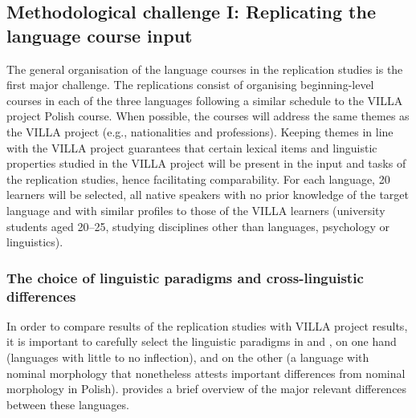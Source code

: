 \documentclass[output=paper,colorlinks,citecolor=brown,modfonts,nonflat]{../langscibook}
\begin{document}
\subsection{Methodological challenge I: Replicating the language course input}\label{sec:watorek:4.1}

The general organisation of the language courses in the replication studies is the first major challenge. The replications consist of organising beginning-level courses in each of the three languages following a similar schedule to the VILLA project Polish course. When possible, the courses will address the same themes as the VILLA project (e.g., nationalities and professions). Keeping themes in line with the VILLA project guarantees that certain lexical items and linguistic properties studied in the VILLA project will be present in the input and tasks of the replication studies, hence facilitating comparability. For each language, 20 learners will be selected, all  native speakers with no prior knowledge of the target language and with similar profiles to those of the VILLA learners (university students aged 20--25, studying disciplines other than languages, psychology or linguistics).

\subsubsection{The choice of linguistic paradigms and cross-linguistic differences}\label{sec:watorek:4.1.1}

In order to compare results of the replication studies with VILLA project results, it is important to carefully select the linguistic paradigms in  and , on one hand (languages with little to no inflection), and  on the other (a language with nominal morphology that nonetheless attests important differences from nominal morphology in Polish).  provides a brief overview of the major relevant differences between these languages.
\end{document}
